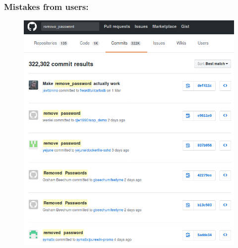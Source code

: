 \documentclass[10pt,aspectratio=169, colorlinks=true, linkcolor=circlBlue]{beamer}
\begin{document}
\begin{frame}
    \frametitle{Mistakes from users:}
        \begin{figure}
            \includegraphics[scale=0.4]{images/git-pass.png}
        \end{figure}
\end{frame}
\end{document}
